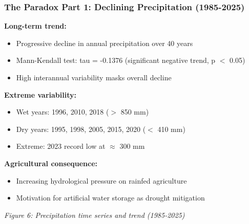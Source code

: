 \documentclass{beamer}
\begin{document}
\begin{frame}
\frametitle{The Paradox Part 1: Declining Precipitation (1985-2025)}

\textbf{Long-term trend:}
\begin{itemize}
  \item Progressive decline in annual precipitation over 40 years
  \item Mann-Kendall test: tau = -0.1376 (significant negative trend, p $<$ 0.05)
  \item High interannual variability masks overall decline
\end{itemize}

\textbf{Extreme variability:}
\begin{itemize}
  \item Wet years: 1996, 2010, 2018 ($>$ 850 mm)
  \item Dry years: 1995, 1998, 2005, 2015, 2020 ($<$ 410 mm)
  \item Extreme: 2023 record low at $\approx$ 300 mm
\end{itemize}

\textbf{Agricultural consequence:}
\begin{itemize}
  \item Increasing hydrological pressure on rainfed agriculture
  \item Motivation for artificial water storage as drought mitigation
\end{itemize}

\begin{center}
  \small{\textit{Figure 6: Precipitation time series and trend (1985-2025)}}
\end{center}
\end{frame}
\end{document}
